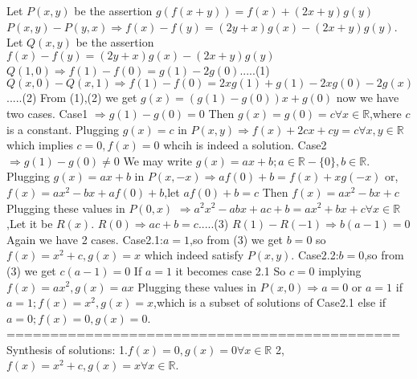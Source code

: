 \begin{solution}
	Let $P(x,y)$ be the assertion $g(f(x+y))=f(x)+(2x+y)g(y)$
$P(x,y)-P(y,x) \Rightarrow f(x)-f(y)=(2y+x)g(x)-(2x+y)g(y)$.
Let $Q(x,y)$ be the assertion $f(x)-f(y)=(2y+x)g(x)-(2x+y)g(y)$
$Q(1,0) \Rightarrow f(1)-f(0)=g(1)-2g(0)$.....(1)
$Q(x,0)-Q(x,1) \Rightarrow f(1)-f(0)=2xg(1)+g(1)-2xg(0)-2g(x)$.....(2)
From (1),(2) we get $g(x)=(g(1)-g(0))x+g(0)$
now we have two cases.
Case1 $\Rightarrow g(1)-g(0)=0$
Then $g(x)=g(0)=c \forall x \in \mathbb {R}$,where $c$ is a constant.
Plugging $g(x)=c$ in $P(x,y) \Rightarrow f(x)+2cx+cy=c \forall x,y \in \mathbb {R}$
which implies $c=0,f(x)=0$ whcih is indeed a solution.
Case2 $\Rightarrow g(1)-g(0) \neq 0$
We may write $g(x)=ax+b;a \in \mathbb {R}-\{0\},b \in \mathbb {R}$.
Plugging $g(x)=ax+b$ in $P(x,-x) \Rightarrow af(0)+b=f(x)+xg(-x)$
or,$f(x)=ax^2-bx+af(0)+b$,let $af(0)+b=c$
Then $f(x)=ax^2-bx+c$
Plugging these values in $P(0,x)$
$\Rightarrow a^2x^2-abx+ac+b=ax^2+bx+c \forall x \in \mathbb {R}$,Let it be $R(x)$.
$R(0) \Rightarrow ac+b=c$.....(3)
$R(1)-R(-1) \Rightarrow b(a-1)=0$
Again we have 2 cases.
Case2.1:$a=1$,so from (3) we get $b=0$
so $f(x)=x^2+c,g(x)=x$ which indeed satisfy $P(x,y)$.
Case2.2:$b=0$,so from (3) we get $c(a-1)=0$
If $a=1$ it becomes case 2.1
So $c=0$ implying $f(x)=ax^2,g(x)=ax$
Plugging these values in $P(x,0) \Rightarrow a=0$ or $a=1$
if $a=1;f(x)=x^2,g(x)=x$,which is a subset of solutions of Case2.1
else if $a=0;f(x)=0,g(x)=0$.
=============================================
Synthesis of solutions:
1.$f(x)=0,g(x)=0 \forall x \in \mathbb {R}$
2,$f(x)=x^2+c,g(x)=x \forall x \in \mathbb {R}$.
\end{solution}



